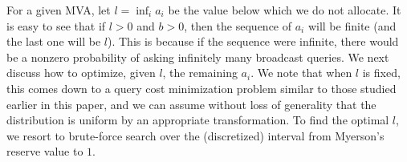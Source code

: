 




For a given MVA, let $l = \inf_i a_i$ be the value below which we do not
allocate.  It is easy to see that if $l>0$ and $b>0$, then the sequence of
$a_i$ will be finite (and the last one will be $l$). This is because if the
sequence were infinite, there would be a nonzero probability of asking
infinitely many broadcast queries.  We next discuss how to optimize, given
$l$, the remaining $a_i$.  We note that when $l$ is fixed, this comes down
to a query cost minimization problem similar to those studied earlier in
this paper, and we can assume without loss of generality that the
distribution is uniform by an appropriate transformation.  To find the
optimal $l$, we resort to brute-force search over the (discretized)
interval from Myerson's reserve value to $1$.




